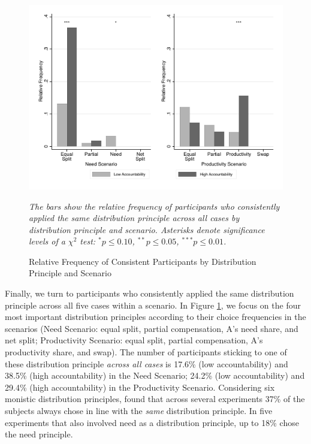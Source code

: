 \documentclass[smallcondensed]{svjour3}
\begin{document}
%
\begin{figure}[ht!]
   \centering
   \includegraphics[scale=0.7]{figures/main_types_2.pdf}
   \begin{minipage}{10cm}
   \footnotesize
   \emph{The bars show the relative frequency of participants who consistently applied the same distribution principle across all cases by distribution principle and scenario. Asterisks denote significance levels of a $\chi^2$ test: $^{*}p\le0.10$, $^{**}p\le0.05$, $^{***}p\le0.01$.}
   \caption{Relative Frequency of Consistent Participants by Distribution Principle and Scenario}
   \label{fig:histogram_types}
\end{minipage}
\end{figure}
%
Finally, we turn to participants who consistently applied the same distribution principle across all five cases within a scenario. In Figure \ref{fig:histogram_types}, we focus on the four most important distribution principles according to their choice frequencies in the scenarios (Need Scenario: equal split, partial compensation, A's need share, and net split; Productivity Scenario: equal split, partial compensation, A's productivity share, and swap). The number of participants sticking to one of these distribution principle \textit{across all cases} is 17.6\% (low accountability) and 38.5\% (high accountability) in the Need Scenario; 24.2\% (low accountability) and 29.4\% (high accountability) in the Productivity Scenario. Considering six monistic distribution principles, \cite{meyer_individual_2019} found that across several experiments 37\% of the subjects always chose in line with the \textit{same} distribution principle. In five experiments that also involved need as a distribution principle, up to 18\% chose the need principle.\par
\end{document}
